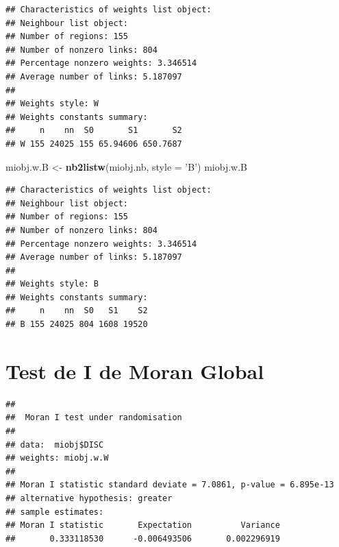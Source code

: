 \documentclass[11pt,]{article}
\newenvironment{Shaded}{\begin{snugshade}}{\end{snugshade}}
\newcommand{\KeywordTok}[1]{\textcolor[rgb]{0.13,0.29,0.53}{\textbf{#1}}}
\newcommand{\DataTypeTok}[1]{\textcolor[rgb]{0.13,0.29,0.53}{#1}}
\newcommand{\StringTok}[1]{\textcolor[rgb]{0.31,0.60,0.02}{#1}}
\newcommand{\OperatorTok}[1]{\textcolor[rgb]{0.81,0.36,0.00}{\textbf{#1}}}
\newcommand{\NormalTok}[1]{#1}
\begin{document}
\begin{verbatim}
## Characteristics of weights list object:
## Neighbour list object:
## Number of regions: 155 
## Number of nonzero links: 804 
## Percentage nonzero weights: 3.346514 
## Average number of links: 5.187097 
## 
## Weights style: W 
## Weights constants summary:
##     n    nn  S0       S1       S2
## W 155 24025 155 65.94606 650.7687
\end{verbatim}

\begin{Shaded}
\begin{Highlighting}[]
\NormalTok{miobj.w.B <-}\StringTok{ }\KeywordTok{nb2listw}\NormalTok{(miobj.nb, }\DataTypeTok{style =} \StringTok{'B'}\NormalTok{)}
\NormalTok{miobj.w.B}
\end{Highlighting}
\end{Shaded}

\begin{verbatim}
## Characteristics of weights list object:
## Neighbour list object:
## Number of regions: 155 
## Number of nonzero links: 804 
## Percentage nonzero weights: 3.346514 
## Average number of links: 5.187097 
## 
## Weights style: B 
## Weights constants summary:
##     n    nn  S0   S1    S2
## B 155 24025 804 1608 19520
\end{verbatim}

\section{Test de I de Moran Global}\label{test-de-i-de-moran-global}

\begin{Shaded}
\end{Shaded}

\begin{verbatim}
## 
##  Moran I test under randomisation
## 
## data:  miobj$DISC  
## weights: miobj.w.W    
## 
## Moran I statistic standard deviate = 7.0861, p-value = 6.895e-13
## alternative hypothesis: greater
## sample estimates:
## Moran I statistic       Expectation          Variance 
##       0.333118530      -0.006493506       0.002296919
\end{verbatim}

\begin{Shaded}
\end{Shaded}
\end{document}
